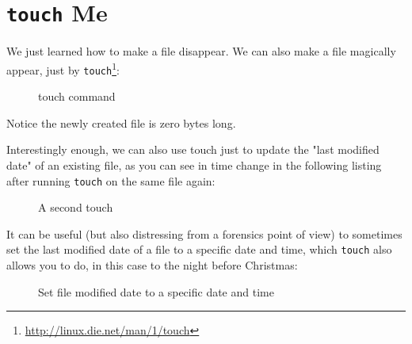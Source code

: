 \documentclass[10pt,american,]{book}
\makeatletter
\newenvironment{Shaded}{\begin{snugshade}}{\end{snugshade}}
\newcommand{\KeywordTok}[1]{\textcolor[rgb]{0.13,0.29,0.53}{\textbf{{#1}}}}
\newcommand{\NormalTok}[1]{{#1}}
\renewcommand{\href}[2]{#2\footnote{\url{#1}}}
\numberwithin{figure}{chapter}
\DeclareRobustCommand{\drcap}[1]{\begin{figure}[H]\caption{#1}\end{figure}}
\DeclareRobustCommand{\drcmd}[1]{\index{Commands!#1@\texttt{#1}}}
\renewcommand{\KeywordTok}[1]{{#1}}
\renewcommand{\NormalTok}[1]{{#1}}
\makeatother
\begin{document}
\section*{\texorpdfstring{\texttt{touch} Me}{touch Me}}\label{touch-me}

We just learned how to make a file disappear. We can also make a file
magically appear, just by
\href{http://linux.die.net/man/1/touch}{\texttt{touch}}\drcmd{touch}:

\drcap{touch command}

\begin{Shaded}
\end{Shaded}

Notice the newly created file is zero bytes long.

Interestingly enough, we can also use touch just to update the "last
modified date" of an existing file, as you can see in time change in the
following listing after running \texttt{touch} on the same file again:

\drcap{A second touch}

\begin{Shaded}
\end{Shaded}

It can be useful (but also distressing from a forensics point of view)
to sometimes set the last modified date of a file to a specific date and
time, which \texttt{touch} also allows you to do, in this case to the
night before Christmas:

\drcap{Set file modified date to a specific date and time}

\begin{Shaded}
\end{Shaded}
\end{document}
